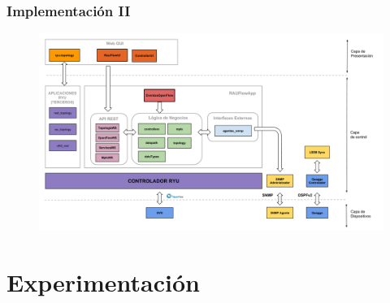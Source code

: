 \documentclass{beamer}
\begin{document}
\begin{frame}
\frametitle{Implementaci\'on II} 

\begin{figure}[H]
\centering
\includegraphics[width=1.0\textwidth]{imagenes/rauflowarquitectura.png}
\end{figure}

\end{frame}

\section{Experimentaci\'on} 
\frame{\tableofcontents[currentsection]}
\end{document}
